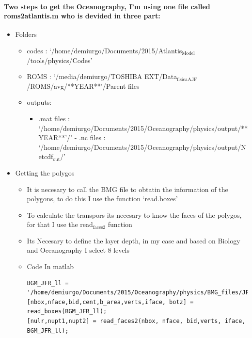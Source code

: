 \documentclass[11pt]{article}
\begin{document}
\paragraph*{Two steps to get the Oceanography, I'm using one file called roms2atlantis.m who is devided in three part:}
\label{sec-4-3-2-2}
\begin{itemize}

\item Folders
\label{sec-4-3-2-2-1}%
\begin{itemize}
\item codes : `/home/demiurgo/Documents/2015/Atlantis$_{\mathrm{Model}}$/tools/physics/Codes'
\item ROMS  : `/media/demiurgo/TOSHIBA EXT/Data$_{\mathrm{fisica}}$$_{\mathrm{AJF}}$/ROMS/avg/**YEAR**'/Parent files
\item outputs:
\begin{itemize}
\item .mat files : `/home/demiurgo/Documents/2015/Oceanography/physics/output/**YEAR**'/'   - .nc files  : `/home/demiurgo/Documents/2015/Oceanography/physics/output/Netcdf$_{\mathrm{out}}$/'
\end{itemize}
\end{itemize}

\item Getting the polygos
\label{sec-4-3-2-2-2}%
\begin{itemize}
\item It is necesary to call the BMG file to obtatin the information of the polygons, to do this I use the function `read.boxes'
\item To calculate the transpors its necesary to know the faces of the polygos, for that I use the read$_{\mathrm{faces2}}$ function
\item Its  Necesary to define the layer depth, in my case and based on Biology and Oceanography I select 8 levels
\end{itemize}
\begin{itemize}

\item Code In matlab\\
\label{sec-4-3-2-2-2-1}%
\begin{verbatim}
BGM_JFR_ll = '/home/demiurgo/Documents/2015/Oceanography/physics/BMG_files/JFRE_ll.bgm';
[nbox,nface,bid,cent,b_area,verts,iface, botz] = read_boxes(BGM_JFR_ll);
[nulr,nupt1,nupt2] = read_faces2(nbox, nface, bid,verts, iface, BGM_JFR_ll);



\end{verbatim}
\end{itemize}
\end{itemize}
\end{document}
